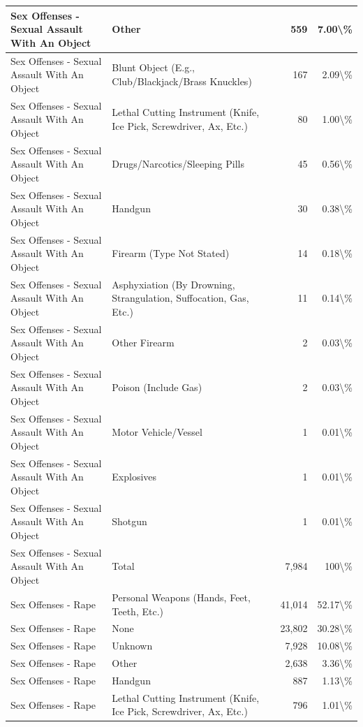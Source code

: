 \documentclass[
]{krantz}
\begin{document}
\begin{longtable}[t]{l|l|r|r}
\hline
Sex Offenses - Sexual Assault With An Object & Other & 559 & 7.00\textbackslash{}\%\\
\hline
Sex Offenses - Sexual Assault With An Object & Blunt Object (E.g., Club/Blackjack/Brass Knuckles) & 167 & 2.09\textbackslash{}\%\\
\hline
Sex Offenses - Sexual Assault With An Object & Lethal Cutting Instrument (Knife, Ice Pick, Screwdriver, Ax, Etc.) & 80 & 1.00\textbackslash{}\%\\
\hline
Sex Offenses - Sexual Assault With An Object & Drugs/Narcotics/Sleeping Pills & 45 & 0.56\textbackslash{}\%\\
\hline
Sex Offenses - Sexual Assault With An Object & Handgun & 30 & 0.38\textbackslash{}\%\\
\hline
Sex Offenses - Sexual Assault With An Object & Firearm (Type Not Stated) & 14 & 0.18\textbackslash{}\%\\
\hline
Sex Offenses - Sexual Assault With An Object & Asphyxiation (By Drowning, Strangulation, Suffocation, Gas, Etc.) & 11 & 0.14\textbackslash{}\%\\
\hline
Sex Offenses - Sexual Assault With An Object & Other Firearm & 2 & 0.03\textbackslash{}\%\\
\hline
Sex Offenses - Sexual Assault With An Object & Poison (Include Gas) & 2 & 0.03\textbackslash{}\%\\
\hline
Sex Offenses - Sexual Assault With An Object & Motor Vehicle/Vessel & 1 & 0.01\textbackslash{}\%\\
\hline
Sex Offenses - Sexual Assault With An Object & Explosives & 1 & 0.01\textbackslash{}\%\\
\hline
Sex Offenses - Sexual Assault With An Object & Shotgun & 1 & 0.01\textbackslash{}\%\\
\hline
Sex Offenses - Sexual Assault With An Object & Total & 7,984 & 100\textbackslash{}\%\\
\hline
Sex Offenses - Rape & Personal Weapons (Hands, Feet, Teeth, Etc.) & 41,014 & 52.17\textbackslash{}\%\\
\hline
Sex Offenses - Rape & None & 23,802 & 30.28\textbackslash{}\%\\
\hline
Sex Offenses - Rape & Unknown & 7,928 & 10.08\textbackslash{}\%\\
\hline
Sex Offenses - Rape & Other & 2,638 & 3.36\textbackslash{}\%\\
\hline
Sex Offenses - Rape & Handgun & 887 & 1.13\textbackslash{}\%\\
\hline
Sex Offenses - Rape & Lethal Cutting Instrument (Knife, Ice Pick, Screwdriver, Ax, Etc.) & 796 & 1.01\textbackslash{}\%\\

\end{longtable}
\end{document}
